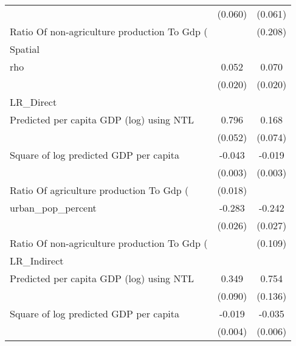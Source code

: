 {\begin{tabular}{l*{2}{c}}
                    &     (0.060)         &     (0.061)         \\
[1em]
Ratio Of non-agriculture production To Gdp (%
                    &                     &     (0.208)         \\
\hline
Spatial             &                     &                     \\
rho                 &       0.052\sym{***}&       0.070\sym{***}\\
                    &     (0.020)         &     (0.020)         \\
\hline
LR\_Direct           &                     &                     \\
Predicted per capita GDP (log) using NTL&       0.796\sym{***}&       0.168\sym{**} \\
                    &     (0.052)         &     (0.074)         \\
[1em]
Square of log predicted GDP per capita&      -0.043\sym{***}&      -0.019\sym{***}\\
                    &     (0.003)         &     (0.003)         \\
[1em]
Ratio Of agriculture production To Gdp (%
                    &     (0.018)         &                     \\
[1em]
urban\_pop\_percent   &      -0.283\sym{***}&      -0.242\sym{***}\\
                    &     (0.026)         &     (0.027)         \\
[1em]
Ratio Of non-agriculture production To Gdp (%
                    &                     &     (0.109)         \\
\hline
LR\_Indirect         &                     &                     \\
Predicted per capita GDP (log) using NTL&       0.349\sym{***}&       0.754\sym{***}\\
                    &     (0.090)         &     (0.136)         \\
[1em]
Square of log predicted GDP per capita&      -0.019\sym{***}&      -0.035\sym{***}\\
                    &     (0.004)         &     (0.006)         \\

\end{tabular}}
